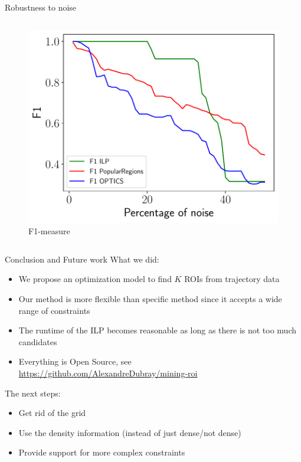 \documentclass[10pt]{beamer}
\begin{document}
\begin{frame}{Robustness to noise}
\begin{columns}[T, onlytextwidth]
        \begin{figure}
            \centering
            \includegraphics[scale=0.3]{figures/results/f1.pdf}
            \caption{F1-measure}
        \end{figure}
    \end{columns}
\end{frame}

\begin{frame}{Conclusion and Future work}
    What we did:
    \begin{itemize}
        \item We propose an optimization model to find $K$ ROIs from trajectory data
        \item Our method is more flexible than specific method since it accepts a wide range of constraints
        \item The runtime of the ILP becomes reasonable as long as there is not too much candidates
        \item Everything is Open Source, see \url{https://github.com/AlexandreDubray/mining-roi}
    \end{itemize}
    The next steps:
    \begin{itemize}
        \item Get rid of the grid
        \item Use the density information (instead of just dense/not dense)
        \item Provide support for more complex constraints
    \end{itemize}
\end{frame}
\end{document}
